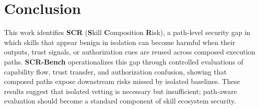 \documentclass{article}
\begin{document}
\section{Conclusion} 
This work identifies \textbf{SCR} (\textbf{S}kill \textbf{C}omposition \textbf{R}isk), a path-level security gap in which skills that appear benign in isolation can become harmful when their outputs, trust signals, or authorization cues are reused across composed execution paths. \textbf{SCR-Bench} operationalizes this gap through controlled evaluations of capability flow, trust transfer, and authorization confusion, showing that composed paths expose downstream risks missed by isolated baselines. These results suggest that isolated vetting is necessary but insufficient; path-aware evaluation should become a standard component of skill ecosystem security.
\end{document}
